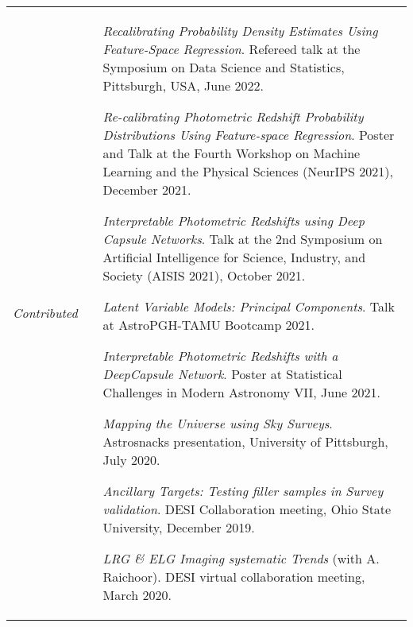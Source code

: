 \documentclass[10pt,a4paper,roman]{moderncv} %
\begin{document}

\begin{tabular}{m{2.4cm} |m{0.3cm} m{15cm}} 
 \emph{Contributed} & &
 \begin{etaremune}
 

    \item \textit{Recalibrating Probability Density Estimates Using Feature-Space Regression}. Refereed talk at the Symposium on Data Science and Statistics, Pittsburgh, USA, June 2022.
    
    \item \textit{Re-calibrating Photometric Redshift Probability Distributions Using Feature-space Regression}. Poster and Talk at the Fourth Workshop on Machine Learning and the Physical Sciences (NeurIPS 2021), December 2021.
    \item \textit{Interpretable Photometric Redshifts using Deep Capsule Networks}. Talk at the 2nd Symposium on Artificial Intelligence for Science, Industry, and Society (AISIS 2021), October 2021.
     \item \textit{Latent Variable Models: Principal Components}. Talk at AstroPGH-TAMU Bootcamp 2021.
    \item \textit{Interpretable Photometric Redshifts with a DeepCapsule Network}. Poster at Statistical Challenges in Modern Astronomy VII, June 2021.
    \item \textit{Mapping the Universe using Sky Surveys}. Astrosnacks presentation, University of Pittsburgh, July 2020.
    \item \textit{Ancillary Targets: Testing filler samples in Survey validation}. DESI Collaboration meeting, Ohio State University, December 2019.
    \item \textit{LRG \& ELG Imaging systematic Trends} (with A. Raichoor). DESI virtual collaboration meeting, March 2020.
\end{etaremune}

\end{tabular}
\end{document}
